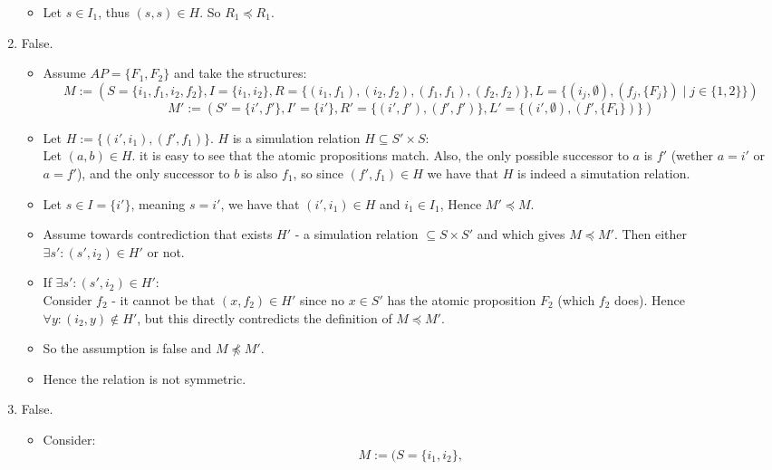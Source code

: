 \documentclass{article}
\begin{document}
\begin{enumerate}[label=\alph*.]
\begin{itemize}
        \item Let $s\in I_1$, thus $(s,s)\in H$. So $R_1\preceq R_1$.
    \end{itemize}
    \item False.
    \begin{itemize}
        \item 
        Assume $AP=\{F_1,F_2\}$ and 
        take the structures:
        \[
            M:=(
                S=\{i_1,f_1, i_2, f_2\},
                I=\{i_1,i_2\},
                R=\{(i_1,f_1),(i_2,f_2), (f_1,f_1), (f_2,f_2)\},
                L=\{(i_j, \emptyset), (f_j,\{F_j\})\mid j\in\{1,2\}\}
            )
        \]
        \[
            M':=(
                S'=\{i',f'\},
                I'=\{i'\},
                R'=\{(i',f'), (f',f')\},
                L'=\{(i', \emptyset), (f', \{F_1\})\}
            )
        \]
        \item Let $H:=\{(i',i_1), (f', f_1)\}$. $H$ is a simulation relation $H\subseteq S'\times S$:\\
        Let $(a,b)\in H$. it is easy to see that the atomic
        propositions match. Also, the only possible successor to $a$
        is $f'$ (wether $a=i'$ or $a=f'$), and the only successor to $b$
        is also $f_1$, so since $(f',f_1)\in H$ we have that $H$ is indeed a simutation relation.
        \item Let $s\in I=\{i'\}$, meaning $s=i'$,
        we have that $(i',i_1)\in H$ and $i_1\in I_1$, Hence $M'\preceq M$.
        \item Assume towards contrediction that exists $H'$ - a simulation relation $\subseteq S\times S'$ 
        and which gives $M\preceq M'$. Then either $\exists s':(s',i_2)\in H'$ or not.
        \item If $\exists s':(s',i_2)\in H'$:\\
        Consider $f_2$ - it cannot be that $(x,f_2)\in H'$ since no $x\in S'$
        has the atomic proposition $F_2$ (which $f_2$ does). Hence $\forall y:(i_2,y)\notin H'$,
        but this directly contredicts the definition of $M\preceq M'$.
        \item So the assumption is false and $M\not\preceq M'$.
        \item Hence the relation is not symmetric.
    \end{itemize}
    \item False.
    \begin{itemize}
        \item Consider:
        \[
            M:=(
                S=\{i_1,i_2\},
\]
\end{itemize}
\end{enumerate}
\end{document}
